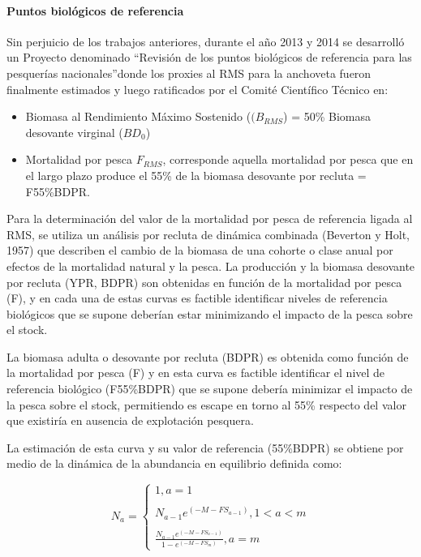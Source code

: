 \documentclass[letter,11pt]{article}
\begin{document}
\paragraph{Puntos biol\'ogicos de referencia}

\quad

Sin perjuicio de los trabajos anteriores, durante el a\~{n}o 2013 y 2014 se
desarroll\'o un Proyecto denominado \textquotedblleft Revisi\'on de los puntos biol\'ogicos de
referencia para las pesquer\'ias nacionales\textquotedblright donde los proxies al RMS
para la anchoveta fueron finalmente estimados y luego ratificados por el
Comit\'e Cient\'ifico T\'ecnico en:

\begin{itemize}
\item
  Biomasa al Rendimiento M\'aximo Sostenido ($(B_{RMS}$) = 50\% Biomasa
  desovante virginal ($BD_{0}$)
\item
  Mortalidad por pesca $F_{RMS}$, corresponde aquella mortalidad por
  pesca que en el largo plazo produce el 55\% de la biomasa desovante
  por recluta = F55\%BDPR.
\end{itemize}

Para la determinaci\'on del valor de la mortalidad por pesca de referencia
ligada al RMS, se utiliza un an\'alisis por recluta de din\'amica combinada
(Beverton y Holt, 1957) que describen el cambio de la biomasa de una
cohorte o clase anual por efectos de la mortalidad natural y la pesca.
La producci\'on y la biomasa desovante por recluta (YPR, BDPR) son
obtenidas en funci\'on de la mortalidad por pesca (F), y en cada una de
estas curvas es factible identificar niveles de referencia biol\'ogicos
que se supone deber\'ian estar minimizando el impacto de la pesca sobre el
stock.

La biomasa adulta o desovante por recluta (BDPR) es obtenida como
funci\'on de la mortalidad por pesca (F) y en esta curva es factible
identificar el nivel de referencia biol\'ogico (F55\%BDPR) que se supone
deber\'ia minimizar el impacto de la pesca sobre el stock, permitiendo es
escape en torno al 55\% respecto del valor que existir\'ia en ausencia de
explotaci\'on pesquera.

La estimaci\'on de esta curva y su valor de referencia (55\%BDPR) se
obtiene por medio de la din\'amica de la abundancia en equilibrio definida
como:

\begin{equation}
N_a = \left\lbrace
\begin{array}{ll}
1,a=1\\
\\
N_{a-1}e^{(-M-FS_{a-1})},1<a<m\\
\\
\frac{N_{a-1}e^{(-M-FS_{a-1})}}{1-e^{(-M-FS_{m})}},a=m
\end{array}
\right.
\end{equation}
\end{document}
